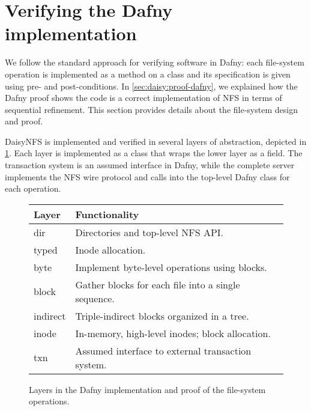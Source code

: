 \section{Verifying the Dafny implementation}%
\label{sec:daisy:design}

We follow the standard approach for verifying software in Dafny: each
file-system operation is implemented as a method on a class and its
specification is given using pre- and post-conditions. In \cref{sec:daisy:proof-dafny},
we explained how the Dafny proof shows the code is a correct implementation of NFS in terms of sequential refinement. This
section provides details about the file-system design and proof.


DaisyNFS is implemented and verified in several layers of abstraction, depicted in
\cref{fig:dafny-layers}. Each layer is implemented as a class that wraps the
lower layer as a field. The transaction system is an assumed interface in Dafny,
while the complete server implements the NFS wire protocol and calls into the
top-level Dafny class for each operation.


\begin{figure}
\small \centering
\begin{tabular}{ll}
  \toprule
  \textbf{Layer} & \textbf{Functionality} \\
  \midrule
  dir & Directories and top-level NFS API. \\
  typed & Inode allocation. \\
  byte & Implement byte-level operations using blocks. \\
  block & Gather blocks for each file into a single sequence. \\
  indirect & Triple-indirect blocks organized in a tree. \\
  inode & In-memory, high-level inodes; block allocation. \\
  txn & Assumed interface to external transaction system. \\
  \bottomrule
\end{tabular}
\caption{Layers in the Dafny implementation and proof of the file-system
operations.}
\label{fig:dafny-layers}
\end{figure}

